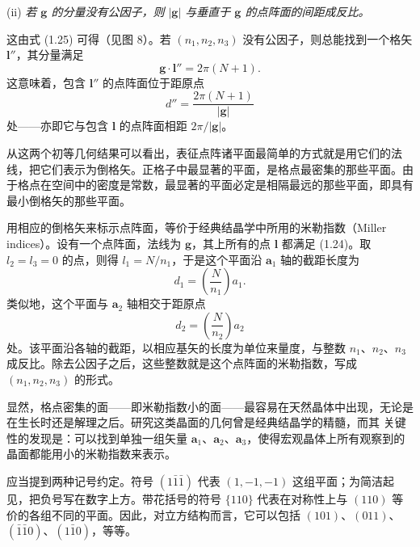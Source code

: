 (ii) \emph{若 $\boldsymbol{g}$ 的分量没有公因子，则 $|\boldsymbol{g}|$ 与垂直于 $\boldsymbol{g}$ 的点阵面的间距成反比。}

这由式 (1.25) 可得（见图 8）。若 $(n_1, n_2, n_3)$ 没有公因子，则总能找到一个格矢 $\boldsymbol{l}''$，其分量满足
\begin{equation*}
\boldsymbol{g}\cdot\boldsymbol{l}'' = 2\pi(N+1).
\tag{1.28}
\end{equation*}
这意味着，包含 $\boldsymbol{l}''$ 的点阵面位于距原点
\begin{equation*}
d'' = \frac{2\pi(N+1)}{|\boldsymbol{g}|}
\tag{1.29}
\end{equation*}
处——亦即它与包含 $\boldsymbol{l}$ 的点阵面相距 $2\pi/|\boldsymbol{g}|$。


从这两个初等几何结果可以看出，表征点阵诸平面最简单的方式就是用它们的法线，把它们表示为倒格矢。正格子中最显著的平面，是格点最密集的那些平面。由于格点在空间中的密度是常数，最显著的平面必定是相隔最远的那些平面，即具有最小倒格矢的那些平面。

用相应的倒格矢来标示点阵面，等价于经典结晶学中所用的米勒指数（Miller indices）。设有一个点阵面，法线为 $\boldsymbol{g}$，其上所有的点 $\boldsymbol{l}$ 都满足 (1.24)。取 $l_2 = l_3 = 0$ 的点，则得 $l_1 = N/n_1$，于是这个平面沿 $\mathbf{a}_1$ 轴的截距长度为
\begin{equation*}
d_1 = \left(\frac{N}{n_1}\right) a_1.
\tag{1.30}
\end{equation*}
类似地，这个平面与 $\mathbf{a}_2$ 轴相交于距原点
\begin{equation*}
d_2 = \left(\frac{N}{n_2}\right) a_2
\tag{1.31}
\end{equation*}
处。该平面沿各轴的截距，以相应基矢的长度为单位来量度，与整数 $n_1$、$n_2$、$n_3$ 成反比。除去公因子之后，这些整数就是这个点阵面的米勒指数，写成 $(n_1, n_2, n_3)$ 的形式。

显然，格点密集的面——即米勒指数小的面——最容易在天然晶体中出现，无论是在生长时还是解理之后。研究这类晶面的几何曾是经典结晶学的精髓，而其
关键性的发现是：可以找到单独一组矢量 $\mathbf{a}_1$、$\mathbf{a}_2$、$\mathbf{a}_3$，使得宏观晶体上所有观察到的晶面都能用小的米勒指数来表示。

应当提到两种记号约定。符号 $(1\bar{1}\bar{1})$ 代表 $(1,-1,-1)$ 这组平面；为简洁起见，把负号写在数字上方。带花括号的符号 $\{110\}$ 代表在对称性上与 $(110)$ 等价的各组不同的平面。因此，对立方结构而言，它可以包括 $(101)$、$(011)$、$(\bar{1}\bar{1}0)$、$(1\bar{1}0)$，等等。

